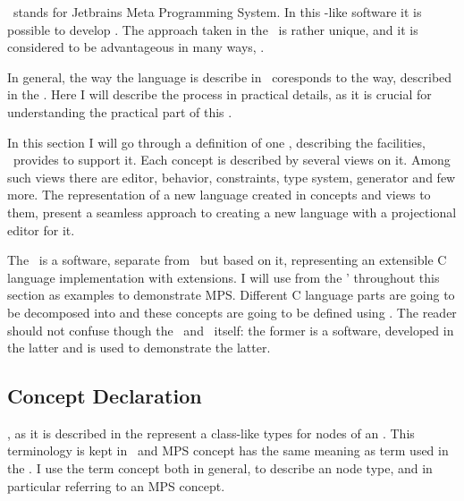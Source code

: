 
\jbmps\ stands for Jetbrains Meta Programming System. In this -like software it is possible to develop .
The approach taken in the \jbmps\ is rather unique, and it is considered to be advantageous in many ways, \cite{Voelter:MoDELS:2010}.


In general, the way the language is describe in \jbmps\ coresponds to the way, described in the .
Here I will describe the process in practical details, as it is crucial for understanding the practical part of this \MT.

In this section I will go through a definition of one , describing the facilities, \jbmps\ provides to support
it. Each concept is described by several views on it. 
Among such views there are editor, behavior, constraints, type system, generator and few more.
The representation of a new language created in concepts and views to them, present a seamless approach to creating 
a new language with a projectional editor for it.

The \mbp\ is a software, separate from \jbmps\, but based on it, representing an extensible C language implementation with extensions.
I will use  from the \mbp' throughout this section as examples to demonstrate MPS. Different C language parts are going to be 
decomposed into  and these concepts are going to be defined using \jbmps. The reader should not confuse though the \mbp\ and 
\jbmps\ itself: the former is a software, developed in the latter and is used to demonstrate the latter.

\subsection{Concept Declaration}

, as it is described in the  represent a class-like types for nodes of an . This terminology is kept in \jbmps\ and 
MPS concept has the same meaning as  term used in the . I use the term concept both in general, to describe an  node type,
and in particular referring to an MPS concept.

%

